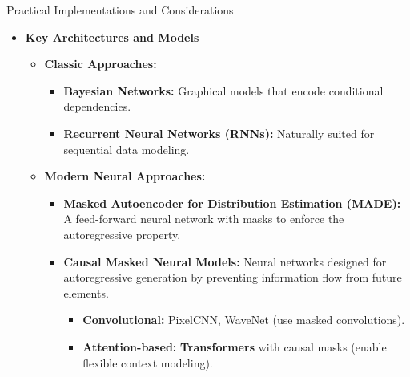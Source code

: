 \begin{frame}[allowframebreaks]{Practical Implementations and Considerations}
    \begin{itemize}
        \item \textbf{Key Architectures and Models}
        \begin{itemize}
            \item \textbf{Classic Approaches:}
            \begin{itemize}
                \item \textbf{Bayesian Networks:} Graphical models that encode conditional dependencies.
                \item \textbf{Recurrent Neural Networks (RNNs):} Naturally suited for sequential data modeling.
            \end{itemize}
            \item \textbf{Modern Neural Approaches:}
            \begin{itemize}
                \item \textbf{Masked Autoencoder for Distribution Estimation (MADE):} A feed-forward neural network with masks to enforce the autoregressive property.
                \item \textbf{Causal Masked Neural Models:} Neural networks designed for autoregressive generation by preventing information flow from future elements.
                \begin{itemize}
                    \item \textbf{Convolutional:} PixelCNN, WaveNet (use masked convolutions).
                    \item \textbf{Attention-based:} \textbf{Transformers} with causal masks (enable flexible context modeling).
                \end{itemize}
            \end{itemize}
        \end{itemize}
    \end{itemize}

    \framebreak


\end{frame}
